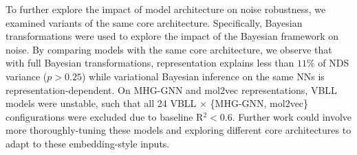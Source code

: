 
To further explore the impact of model architecture on noise robustness, we examined variants of the same core architecture. Specifically, Bayesian transformations were used to explore the impact of the Bayesian framework on noise. By comparing models with the same core architecture, we observe that with full Bayesian transformations, representation explains less than $11\%$ of NDS variance ($p > 0.25$) while variational Bayesian inference on the same NNs is representation-dependent. On MHG-GNN and mol2vec representations, VBLL models were unstable, such that all 24 VBLL $\times$ \{MHG-GNN, mol2vec\} configurations were excluded due to baseline R$^2 < 0.6$. Further work could involve more thoroughly-tuning these models and exploring different core architectures to adapt to these embedding-style inputs. 

